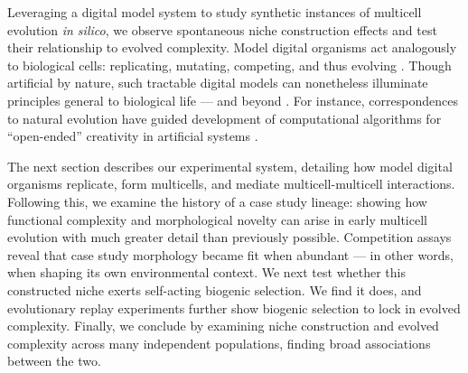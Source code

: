 Leveraging a digital model system to study synthetic instances of multicell evolution \textit{in silico}, we observe spontaneous niche construction effects and test their relationship to evolved complexity.
Model digital organisms act analogously to biological cells: replicating, mutating, competing, and thus evolving \unskip\citep{pennock2007models}.
Though artificial by nature, such tractable digital models can nonetheless illuminate principles general to biological life --- and beyond \citep{adami2000evolution,lenski2003evolutionary,zaman2014coevolution}.
For instance, correspondences to natural evolution have guided development of computational algorithms for ``open-ended'' creativity in artificial systems \citep{dolson2019constructive,soros2014identifying,huizinga2018emergence,lehman2012beyond,nguyen2015,stanley2019open,packard2019overview,taylor2016open}.

The next section describes our experimental system, detailing how model digital organisms replicate, form multicells, and mediate multicell-multicell interactions.
Following this, we examine the history of a case study lineage: showing how functional complexity and morphological novelty can arise in early multicell evolution with much greater detail than previously possible.
Competition assays reveal that case study morphology became fit when abundant --- in other words, when shaping its own environmental context.
We next test whether this constructed niche exerts self-acting biogenic selection.
We find it does, and evolutionary replay experiments further show biogenic selection to lock in evolved complexity.
Finally, we conclude by examining niche construction and evolved complexity across many independent populations, finding broad associations between the two.






